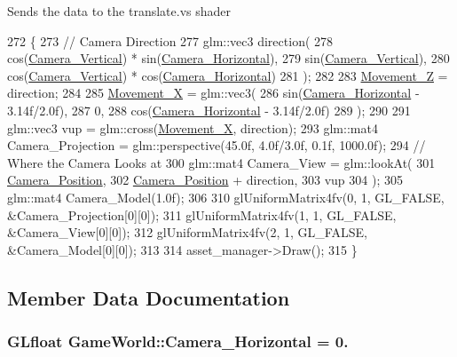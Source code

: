 Sends the data to the translate.\+vs shader
\begin{DoxyCode}
272                      \{
273         \textcolor{comment}{// Camera Direction}
277 \textcolor{comment}{}        glm::vec3 direction(
278         cos(\hyperlink{classGameWorld_a26658e739c4d267b1be35ed820089931}{Camera\_Vertical}) * sin(\hyperlink{classGameWorld_a7f4911dda9b3b4e4eb03ece87e16cd96}{Camera\_Horizontal}),
279         sin(\hyperlink{classGameWorld_a26658e739c4d267b1be35ed820089931}{Camera\_Vertical}),
280         cos(\hyperlink{classGameWorld_a26658e739c4d267b1be35ed820089931}{Camera\_Vertical}) * cos(\hyperlink{classGameWorld_a7f4911dda9b3b4e4eb03ece87e16cd96}{Camera\_Horizontal})
281     );
282 
283     \hyperlink{classGameWorld_a8dd30ba92e7fa9b9b05075e31d1e7dd8}{Movement\_Z} = direction;
284 
285     \hyperlink{classGameWorld_a968eb29424b68f7cd79a5896c62e944d}{Movement\_X} = glm::vec3(
286         sin(\hyperlink{classGameWorld_a7f4911dda9b3b4e4eb03ece87e16cd96}{Camera\_Horizontal} - 3.14f/2.0f),
287         0,
288         cos(\hyperlink{classGameWorld_a7f4911dda9b3b4e4eb03ece87e16cd96}{Camera\_Horizontal} - 3.14f/2.0f)
289     );
290 
291     glm::vec3 vup = glm::cross(\hyperlink{classGameWorld_a968eb29424b68f7cd79a5896c62e944d}{Movement\_X}, direction);
293     glm::mat4 Camera\_Projection = glm::perspective(45.0f, 4.0f/3.0f, 0.1f, 1000.0f);
294         \textcolor{comment}{// Where the Camera Looks at}
300 \textcolor{comment}{}    glm::mat4 Camera\_View = glm::lookAt(
301         \hyperlink{classGameWorld_ad80e597474ea4c52a583e81788187571}{Camera\_Position},
302         \hyperlink{classGameWorld_ad80e597474ea4c52a583e81788187571}{Camera\_Position} + direction,
303         vup
304     );
305     glm::mat4 Camera\_Model(1.0f);
306 
310     glUniformMatrix4fv(0, 1, GL\_FALSE, &Camera\_Projection[0][0]);
311     glUniformMatrix4fv(1, 1, GL\_FALSE, &Camera\_View[0][0]);
312     glUniformMatrix4fv(2, 1, GL\_FALSE, &Camera\_Model[0][0]);
313 
314         asset\_manager->Draw();
315 \}
\end{DoxyCode}


\subsection{Member Data Documentation}
\hypertarget{classGameWorld_a7f4911dda9b3b4e4eb03ece87e16cd96}{}
\subsubsection[{Camera\+\_\+\+Horizontal}]{\setlength{\rightskip}{0pt plus 5cm}G\+Lfloat Game\+World\+::\+Camera\+\_\+\+Horizontal = 0.}\label{classGameWorld_a7f4911dda9b3b4e4eb03ece87e16cd96}
\hypertarget{classGameWorld_ad80e597474ea4c52a583e81788187571}{}
